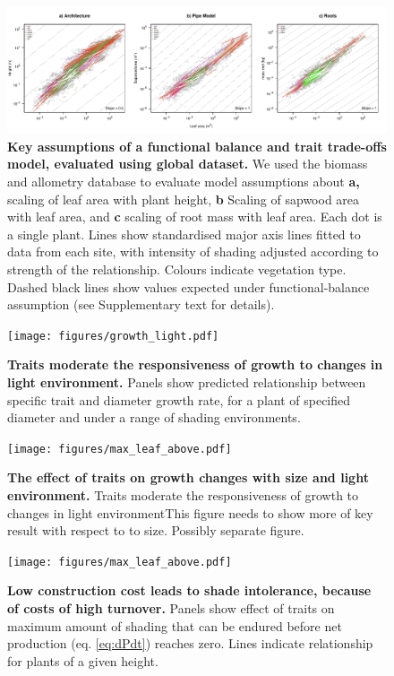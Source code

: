 \documentclass[12pt, a4paper]{article}
\makeatletter
\def\maxwidth{\ifdim\Gin@nat@width>\linewidth\linewidth
\else\Gin@nat@width\fi}
\let\Oldincludegraphics\includegraphics
\renewcommand{\includegraphics}[1]{\Oldincludegraphics[width=\maxwidth]{#1}}
\makeatother
\begin{document}
\begin{figure}[htbp]
\centering
\includegraphics{figs/allometry.pdf}
\caption{\textbf{Key assumptions of a functional balance and trait
trade-offs model, evaluated using global dataset.} We used the biomass and
allometry database to evaluate model assumptions about \textbf{a,}
scaling of leaf area with plant height, \textbf{b} Scaling of sapwood
area with leaf area, and \textbf{c} scaling of root mass with leaf area.
Each dot is a single plant. Lines show standardised major axis lines
fitted to data from each site, with intensity of shading adjusted
according to strength of the relationship. Colours indicate vegetation
type. Dashed black lines show values expected under functional-balance
assumption (see Supplementary text for details). \label{f-assumptions}}
\end{figure}

\newpage

\begin{figure}[htbp]
\centering
\texttt{[image: figures/growth\_light.pdf]}
\caption{\textbf{Traits moderate the responsiveness of growth to changes
in light environment.} Panels show predicted relationship between
specific trait and diameter growth rate, for a plant of specified
diameter and under a range of shading environments.
\label{f-growth_light}}
\end{figure}

\newpage

\begin{figure}[htbp]
\centering
\texttt{[image: figures/max\_leaf\_above.pdf]}
\caption{\textbf{The effect of traits on growth changes with size and
light environment.} Traits moderate the responsiveness of growth to changes in light
environmentThis figure needs to show more of key result with respect to to size.
Possibly separate figure. \label{f-shifts}}
\end{figure}

\newpage

\begin{figure}[htbp]
\centering
\texttt{[image: figures/max\_leaf\_above.pdf]}
\caption{\textbf{Low construction cost leads to shade intolerance,
because of costs of high turnover.} Panels show effect of traits on
maximum amount of shading that can be endured before net production (eq.
\ref{eq:dPdt}) reaches zero. Lines indicate relationship for plants of a
given height. \label{f-wplcp}}
\end{figure}

\newpage


\end{document}
